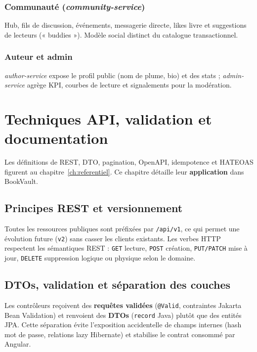 \documentclass[12pt,a4paper]{report}
\begin{document}
\subsection{Communauté (\textit{community-service})}
Hub, fils de discussion, événements, messagerie directe, likes livre et suggestions de lecteurs (« buddies »). Modèle social distinct du catalogue transactionnel.\par

\subsection{Auteur et admin}
\textit{author-service} expose le profil public (nom de plume, bio) et des stats ; \textit{admin-service} agrège KPI, courbes de lecture et signalements pour la modération.\par

\chapter{Techniques API, validation et documentation}

Les définitions de REST, DTO, pagination, OpenAPI, idempotence et HATEOAS figurent au chapitre~\ref{ch:referentiel}. Ce chapitre détaille leur \textbf{application} dans BookVault.

\section{Principes REST et versionnement}
Toutes les ressources publiques sont préfixées par \texttt{/api/v1}, ce qui permet une évolution future (\texttt{v2}) sans casser les clients existants. Les verbes HTTP respectent les sémantiques REST : \texttt{GET} lecture, \texttt{POST} création, \texttt{PUT/PATCH} mise à jour, \texttt{DELETE} suppression logique ou physique selon le domaine.\par

\section{DTOs, validation et séparation des couches}
Les contrôleurs reçoivent des \textbf{requêtes validées} (\texttt{@Valid}, contraintes Jakarta Bean Validation) et renvoient des \textbf{DTOs} (\texttt{record} Java) plutôt que des entités JPA. Cette séparation évite l'exposition accidentelle de champs internes (hash mot de passe, relations lazy Hibernate) et stabilise le contrat consommé par Angular.\par
\end{document}
